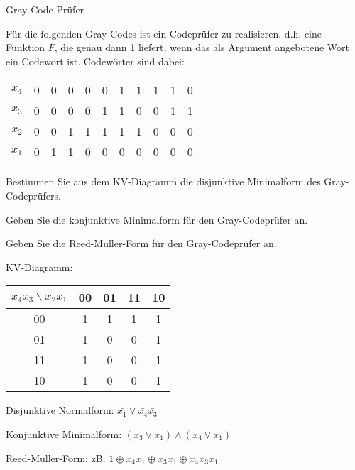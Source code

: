 \documentclass{exercisesheet}
\begin{document}
\begin{eexercises}{Gray-Code Prüfer}{
    Für die folgenden Gray-Codes ist ein Codeprüfer zu realisieren, d.h. eine Funktion $F$, die genau dann 1 liefert, wenn das als Argument angebotene Wort ein Codewort ist. Codewörter sind dabei:\par
    \begin{tabular}{c|cccc cccc cc}
      $x_4$ & 0 & 0 & 0 & 0 & 0 & 1 & 1 & 1 & 1 & 0 \\
      $x_3$ & 0 & 0 & 0 & 0 & 1 & 1 & 0 & 0 & 1 & 1 \\
      $x_2$ & 0 & 0 & 1 & 1 & 1 & 1 & 1 & 0 & 0 & 0 \\
      $x_1$ & 0 & 1 & 1 & 0 & 0 & 0 & 0 & 0 & 0 & 0 \\
    \end{tabular}
  }
  \item Bestimmen Sie aus dem KV-Diagramm die disjunktive Minimalform des Gray-Codeprüfers.\points[5]
  \item Geben Sie die konjunktive Minimalform für den Gray-Codeprüfer an.\points[3]
  \item Geben Sie die Reed-Muller-Form für den Gray-Codeprüfer an.\points[3]\par
\end{eexercises}

\begin{solutions}
  \item KV-Diagramm:
  \begin{tabular}{c|cccc}
    $x_4x_3\backslash x_2x_1$ & 00 & 01 & 11 & 10 \\
    \hline
    00                        & 1  & 1  & 1  & 1  \\
    01                        & 1  & 0  & 0  & 1  \\
    11                        & 1  & 0  & 0  & 1  \\
    10                        & 1  & 0  & 0  & 1  \\
  \end{tabular}\par
  Disjunktive Normalform: $\bar{x_1}\lor\bar{x_4}\bar{x_3}$
  \item Konjunktive Minimalform: $(\bar{x_3}\lor\bar{x_1})\land(\bar{x_4}\lor\bar{x_1})$
  \item Reed-Muller-Form: zB. $1\oplus x_4x_1\oplus x_3x_1\oplus x_4x_3x_1$
\end{solutions}
\end{document}
